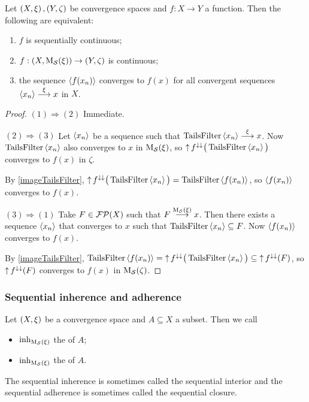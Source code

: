 \begin{proposition}
Let $\left( X,\xi \right), \left( Y,\zeta \right)$ be convergence spaces and $f:X\to Y$ a function. Then the following are equivalent:
\begin{enumerate}
\item $f$ is sequentially continuous;
\item $f: \left( X, \operatorname{M_\mathcal{S}}(\xi) \right) \to \left( Y, \zeta \right)$ is continuous;
\item the sequence $\left\langle f(x_n) \right\rangle$ converges to $f(x)$ for all convergent sequences $\left\langle x_n \right\rangle\overset{\xi}{\longrightarrow} x$ in $X$.
\end{enumerate}
\end{proposition}
\begin{proof}
$(1) \Rightarrow (2)$ Immediate.

$(2) \Rightarrow (3)$ Let $\left\langle x_n \right\rangle$ be a sequence such that $\operatorname{TailsFilter}\left\langle x_n \right\rangle\overset{\xi}{\longrightarrow} x$. Now $\operatorname{TailsFilter}\left\langle x_n \right\rangle$ also converges to $x$ in $\operatorname{M_\mathcal{S}}(\xi)$, so $\operatorname{\uparrow} f^{\downarrow\downarrow}\big(\operatorname{TailsFilter}\left\langle x_n \right\rangle\big)$ converges to $f(x)$ in $\zeta$.

By \ref{imageTailsFilter}, $\operatorname{\uparrow} f^{\downarrow\downarrow}\big(\operatorname{TailsFilter}\left\langle x_n \right\rangle\big) = \operatorname{TailsFilter}\left\langle f(x_n) \right\rangle$, so $\left\langle f(x_n) \right\rangle$ converges to $f(x)$.

$(3) \Rightarrow (1)$ Take $F\in \operatorname{\mathcal{FP}}(X)$ such that $F\overset{\operatorname{M_\mathcal{S}}(\xi)}{\longrightarrow} x$. Then there exists a sequence $\left\langle x_n \right\rangle$ that converges to $x$ such that $\operatorname{TailsFilter}\left\langle x_n \right\rangle\subseteq F$. Now $\left\langle f(x_n) \right\rangle$ converges to $f(x)$. 

By \ref{imageTailsFilter}, $\operatorname{TailsFilter}\left\langle f(x_n) \right\rangle = \operatorname{\uparrow} f^{\downarrow\downarrow}\big(\operatorname{TailsFilter}\left\langle x_n \right\rangle\big) \subseteq \operatorname{\uparrow} f^{\downarrow\downarrow}(F)$, so $\operatorname{\uparrow} f^{\downarrow\downarrow}(F)$ converges to $f(x)$ in $\operatorname{M_\mathcal{S}}(\zeta)$.
\end{proof}

\subsubsection{Sequential inherence and adherence}
\begin{definition}
Let $\left( X,\xi \right)$ be a convergence space and $A\subseteq X$ a subset. Then we call
\begin{itemize}
\item $\operatorname{inh}_{\operatorname{M_\mathcal{S}}(\xi)}$ the  of $A$;
\item $\operatorname{inh}_{\operatorname{M_\mathcal{S}}(\xi)}$ the  of $A$.
\end{itemize}
\end{definition}
The sequential inherence is sometimes called the sequential interior and the sequential adherence is sometimes called the sequential closure.

